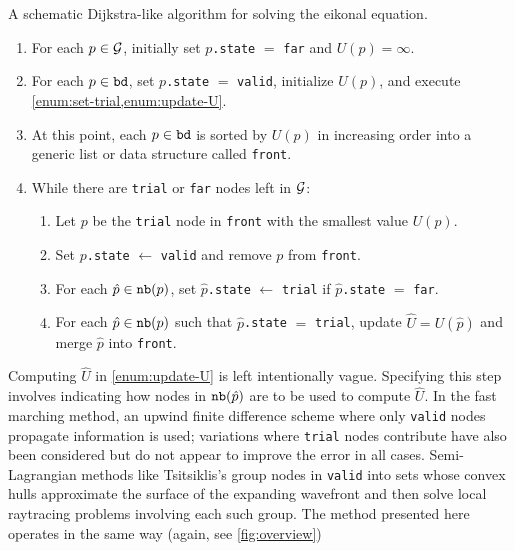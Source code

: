 \documentclass[eikonal.tex]{subfiles}
\begin{document}
\begin{algorithm}
  \caption{A schematic Dijkstra-like algorithm for solving the eikonal
    equation.}\label{alg:dijkstra-like}
  \begin{enumerate}[nolistsep]
  \item For each $p \in \mathcal{G}$, initially set $p$\texttt{.state} $=$
    \texttt{far} and $U(p) = \infty$.
  \item For each $p \in \texttt{bd}$, set $p$\texttt{.state} $=$
    \texttt{valid}, initialize $U(p)$, and execute
    \cref{enum:set-trial,enum:update-U}.
  \item At this point, each $p \in \texttt{bd}$ is sorted by $U(p)$ in
    increasing order into a generic list or data structure called
    \texttt{front}.
  \item While there are \texttt{trial} or \texttt{far} nodes left in
    $\mathcal{G}$:
    \begin{enumerate}[nolistsep]
    \item Let $p$ be the \texttt{trial} node in \texttt{front} with
      the smallest value $U(p)$.
    \item Set $p$\texttt{.state} $\gets$ \texttt{valid} and remove $p$
      from \texttt{front}.
    \item For each $\hat{p} \in \texttt{nb}(p)$, set
      $\hat{p}$\texttt{.state} $\gets$ \texttt{trial} if
      $\hat{p}$\texttt{.state} $=$ \texttt{far}.\label{enum:set-trial}
    \item For each $\hat{p} \in \texttt{nb}(p)$ such that
      $\hat{p}$\texttt{.state} $=$ \texttt{trial}, update
      $\hat{U} = U(\hat{p})$ and merge $\hat{p}$ into
      \texttt{front}.\label{enum:update-U}
    \end{enumerate}
  \end{enumerate}
\end{algorithm}

Computing $\hat{U}$ in \cref{enum:update-U} is left intentionally
vague. Specifying this step involves indicating how nodes in
$\texttt{nb}(\hat{p})$ are to be used to compute $\hat{U}$. In the fast
marching method, an upwind finite difference scheme where only
\texttt{valid} nodes propagate information is used; variations where
\texttt{trial} nodes contribute have also been considered but do not
appear to improve the error in all cases. Semi-Lagrangian methods like
Tsitsiklis's group nodes in \texttt{valid} into sets whose convex
hulls approximate the surface of the expanding wavefront and then
solve local raytracing problems involving each such group. The method
presented here operates in the same way (again, see
\cref{fig:overview})
\end{document}
